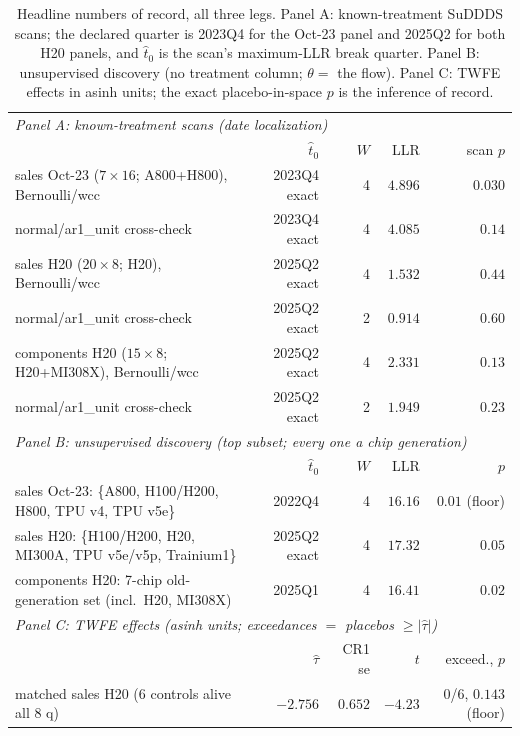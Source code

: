 \documentclass[11pt]{article}
\begin{document}
\begin{table}[t]
\centering
\scriptsize
\caption{Headline numbers of record, all three legs. Panel A: known-treatment
SuDDDS scans; the declared quarter is 2023Q4 for the Oct-23 panel and 2025Q2
for both H20 panels, and $\hat t_0$ is the scan's maximum-LLR break quarter.
Panel B: unsupervised discovery (no treatment column; $\theta=$ the flow).
Panel C: TWFE effects in asinh units; the exact placebo-in-space $p$ is the
inference of record.}
\label{tab:main}
\setlength{\tabcolsep}{4pt}
\begin{tabular}{lrrrr}
\toprule
\multicolumn{5}{l}{\emph{Panel A: known-treatment scans (date localization)}}\\
 & $\hat t_0$ & $W$ & LLR & scan $p$ \\
\midrule
sales Oct-23 ($7\times 16$; A800+H800), Bernoulli/wcc & 2023Q4 exact & 4 & $4.896$ & $0.030$ \\
\quad normal/ar1\_unit cross-check & 2023Q4 exact & 4 & $4.085$ & $0.14$ \\
sales H20 ($20\times 8$; H20), Bernoulli/wcc & 2025Q2 exact & 4 & $1.532$ & $0.44$ \\
\quad normal/ar1\_unit cross-check & 2025Q2 exact & 2 & $0.914$ & $0.60$ \\
components H20 ($15\times 8$; H20+MI308X), Bernoulli/wcc & 2025Q2 exact & 4 & $2.331$ & $0.13$ \\
\quad normal/ar1\_unit cross-check & 2025Q2 exact & 2 & $1.949$ & $0.23$ \\
\midrule
\multicolumn{5}{l}{\emph{Panel B: unsupervised discovery (top subset; every one a chip generation)}}\\
 & $\hat t_0$ & $W$ & LLR & $p$ \\
\midrule
sales Oct-23: \{A800, H100/H200, H800, TPU v4, TPU v5e\} & 2022Q4 & 4 & $16.16$ & $0.01$ (floor) \\
sales H20: \{H100/H200, H20, MI300A, TPU v5e/v5p, Trainium1\} & 2025Q2 exact & 4 & $17.32$ & $0.05$ \\
components H20: 7-chip old-generation set (incl.\ H20, MI308X) & 2025Q1 & 4 & $16.41$ & $0.02$ \\
\midrule
\multicolumn{5}{l}{\emph{Panel C: TWFE effects (asinh units; exceedances $=$ placebos $\geq|\hat\tau|$)}}\\
 & $\hat\tau$ & CR1 se & $t$ & exceed., $p$ \\
\midrule
matched sales H20 (6 controls alive all 8 q) & $-2.756$ & $0.652$ & $-4.23$ & 0/6, $0.143$ (floor) \\

\end{tabular}
\end{table}
\end{document}
